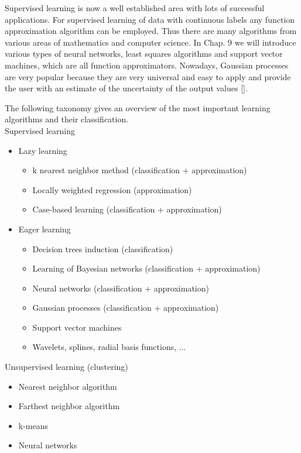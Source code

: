 \documentclass[10pt]{book}
\begin{document}
Supervised learning is now a well established area with lots of successful applications. For supervised learning of data with continuous labels any function approximation algorithm can be employed. Thus there are many algorithms from various areas of mathematics and computer science. In Chap. 9 we will introduce various types of neural networks, least squares algorithms and support vector machines, which are all function approximators. Nowadays, Gaussian processes are very popular because they are very universal and easy to apply and provide the user with an estimate of the uncertainty of the output values [\cite{rasmussen2006gpml}].

The following taxonomy gives an overview of the most important learning algorithms and their classification.\\
Supervised learning

\begin{itemize}
  \item Lazy learning
  \begin{itemize}
    \item k nearest neighbor method (classification + approximation)
    \item Locally weighted regression (approximation)
    \item Case-based learning (classification + approximation)
  \end{itemize}
  \item Eager learning
  \begin{itemize}
    \item Decision trees induction (classification)
    \item Learning of Bayesian networks (classification + approximation)
    \item Neural networks (classification + approximation)
    \item Gaussian processes (classification + approximation)
    \item Support vector machines
    \item Wavelets, splines, radial basis functions, ...
  \end{itemize}
\end{itemize}

Unsupervised learning (clustering)

\begin{itemize}
  \item Nearest neighbor algorithm
  \item Farthest neighbor algorithm
  \item k-means
  \item Neural networks
\end{itemize}
\end{document}

